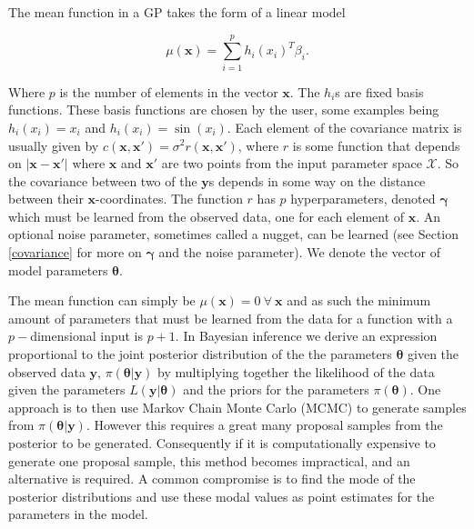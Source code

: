 \documentclass[
  12pt,
  a4paper,
  twoside]{book}
\begin{document}
The mean function in a GP takes the form of a linear model

\begin{equation}
\label{eq:mean-function}
\mu(\mathbf{x}) = \sum_{i=1}^p h_i(x_i)^T \beta_i.
\end{equation}

Where \(p\) is the number of elements in the vector \(\mathbf{x}\). The \(h_i\)s are fixed basis functions. These basis functions are chosen by the user, some examples being \(h_i(x_i) = x_i\) and \(h_i(x_i) = \sin(x_i)\). Each element of the covariance matrix is usually given by \(c(\mathbf{x}, \mathbf{x'})=\sigma^2 r(\mathbf{x}, \mathbf{x'})\), where \(r\) is some function that depends on \(|\mathbf{x} - \mathbf{x'}|\) where \(\mathbf{x}\) and \(\mathbf{x'}\) are two points from the input parameter space \(\mathcal{X}\). So the covariance between two of the \(\mathbf{y}\)s depends in some way on the distance between their \(\mathbf{x}\)-coordinates. The function \(r\) has \(p\) hyperparameters, denoted \(\mathbf{\gamma}\) which must be learned from the observed data, one for each element of \(\mathbf{x}\). An optional noise parameter, sometimes called a nugget, can be learned (see Section \ref{covariance} for more on \(\mathbf{\gamma}\) and the noise parameter). We denote the vector of model parameters \(\mathbf{\theta}\).

The mean function can simply be \(\mu(\mathbf{x})=0~\forall~\mathbf{x}\) and as such the minimum amount of parameters that must be learned from the data for a function with a \(p-\)dimensional input is \(p+1\). In Bayesian inference we derive an expression proportional to the joint posterior distribution of the the parameters \(\mathbf{\theta}\) given the observed data \(\mathbf{y}\), \(\pi(\mathbf{\theta}|\mathbf{y})\) by multiplying together the likelihood of the data given the parameters \(L(\mathbf{y}| \mathbf{\theta})\) and the priors for the parameters \(\pi(\mathbf{\theta})\). One approach is to then use Markov Chain Monte Carlo (MCMC) to generate samples from \(\pi(\mathbf{\theta}|\mathbf{y})\). However this requires a great many proposal samples from the posterior to be generated. Consequently if it is computationally expensive to generate one proposal sample, this method becomes impractical, and an alternative is required. A common compromise is to find the mode of the posterior distributions and use these modal values as point estimates for the parameters in the model.
\end{document}
